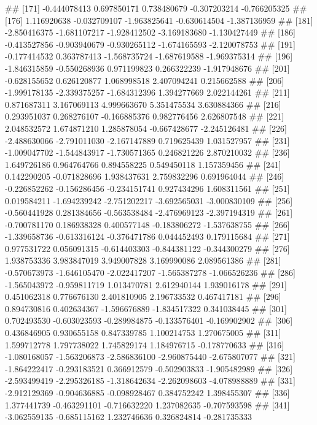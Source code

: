 \documentclass[
]{article}
\begin{document}
\begin{enumerate}[label=(\alph*)]
##  [171] -0.444078413  0.697850171  0.738480679 -0.307203214 -0.766205325
##  [176]  1.116920638 -0.032709107 -1.963825641 -0.630614504 -1.387136959
##  [181] -2.850416375 -1.681107217 -1.928412502 -3.169183680 -1.130427449
##  [186] -0.413527856 -0.903940679 -0.930265112 -1.674165593 -2.120078753
##  [191] -0.177414532  0.363787413 -1.568735724 -1.687619588 -1.969375314
##  [196] -1.846315859 -0.550268936  0.971199823  0.266322239 -1.917948676
##  [201] -0.628155652  0.626120877  1.068998518  2.407094241  0.215662588
##  [206] -1.999178135 -2.339375257 -1.684312396  1.394277669  2.022144261
##  [211]  0.871687311  3.167069113  4.999663670  5.351475534  3.630884366
##  [216]  0.293951037  0.268276107 -0.166885376  0.982776456  2.626807548
##  [221]  2.048532572  1.674871210  1.285878054 -0.667428677 -2.245126481
##  [226] -2.488630066 -2.791011030 -2.167147889  0.719625439  1.031527957
##  [231] -1.009047702 -1.544843917 -1.730571365  0.246821226  2.870210032
##  [236]  1.649726186  0.964764766  0.894558225  0.549450118  1.157359456
##  [241]  0.142290205 -0.071828696  1.938437631  2.759832296  0.691964044
##  [246] -0.226852262 -0.156286456 -0.234151741  0.927434296  1.608311561
##  [251]  0.019584211 -1.694239242 -2.751202217 -3.692565031 -3.000830109
##  [256] -0.560441928  0.281384656 -0.563538484 -2.476969123 -2.397194319
##  [261] -0.700781170  0.186938328  0.400577148 -0.183806272 -1.537638755
##  [266] -1.339658736 -0.613316124 -0.376471786  0.044452493  0.179115684
##  [271]  0.977531722  0.056091315 -0.614403303 -0.844381122 -0.344300279
##  [276]  1.938753336  3.983847019  3.949007828  3.169990086  2.089561386
##  [281] -0.570673973 -1.646105470 -2.022417207 -1.565387278 -1.066526236
##  [286] -1.565043972 -0.959811719  1.013470781  2.612940144  1.939016178
##  [291]  0.451062318  0.776676130  2.401810905  2.196733532  0.467417181
##  [296]  0.894730816  0.402634367 -1.596676889 -1.834517322  0.341038445
##  [301]  0.702493530 -0.603023593 -0.289984875 -0.133576401 -0.169902902
##  [306]  0.436846905  0.930655158  0.847339785  1.100214753  1.270675005
##  [311]  1.599712778  1.797738022  1.745829174  1.184976715 -0.178770633
##  [316] -1.080168057 -1.563206873 -2.586836100 -2.960875440 -2.675807077
##  [321] -1.864222417 -0.293183521  0.366912579 -0.502903833 -1.905482989
##  [326] -2.593499419 -2.295326185 -1.318642634 -2.262098603 -4.078988889
##  [331] -2.912129369 -0.904636885 -0.098928467  0.384752242  1.398455307
##  [336]  1.377441739 -0.463291101 -0.716632220  1.237082635 -0.707593598
##  [341] -3.062559135 -0.685115162  1.232746636  0.326824814 -0.281735333

\end{enumerate}
\end{document}
